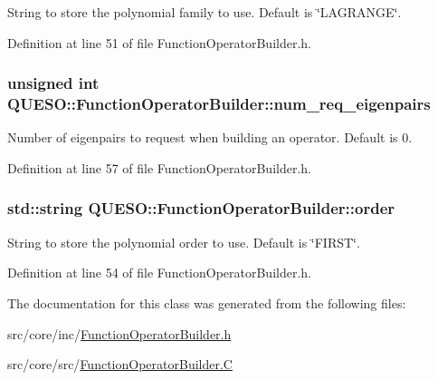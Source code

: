 String to store the polynomial family to use. Default is \char`\"{}\-L\-A\-G\-R\-A\-N\-G\-E\char`\"{}. 



Definition at line 51 of file Function\-Operator\-Builder.\-h.

\hypertarget{class_q_u_e_s_o_1_1_function_operator_builder_a41ced477ecceabab7828ead4bd3e75aa}{
\subsubsection[{num\-\_\-req\-\_\-eigenpairs}]{\setlength{\rightskip}{0pt plus 5cm}unsigned int Q\-U\-E\-S\-O\-::\-Function\-Operator\-Builder\-::num\-\_\-req\-\_\-eigenpairs}}\label{class_q_u_e_s_o_1_1_function_operator_builder_a41ced477ecceabab7828ead4bd3e75aa}


Number of eigenpairs to request when building an operator. Default is 0. 



Definition at line 57 of file Function\-Operator\-Builder.\-h.

\hypertarget{class_q_u_e_s_o_1_1_function_operator_builder_a433752867d11bca3f3bd7015e1a23e93}{
\subsubsection[{order}]{\setlength{\rightskip}{0pt plus 5cm}std\-::string Q\-U\-E\-S\-O\-::\-Function\-Operator\-Builder\-::order}}\label{class_q_u_e_s_o_1_1_function_operator_builder_a433752867d11bca3f3bd7015e1a23e93}


String to store the polynomial order to use. Default is \char`\"{}\-F\-I\-R\-S\-T\char`\"{}. 



Definition at line 54 of file Function\-Operator\-Builder.\-h.



The documentation for this class was generated from the following files\-:\begin{DoxyCompactItemize}
\item 
src/core/inc/\hyperlink{_function_operator_builder_8h}{Function\-Operator\-Builder.\-h}\item 
src/core/src/\hyperlink{_function_operator_builder_8_c}{Function\-Operator\-Builder.\-C}\end{DoxyCompactItemize}
